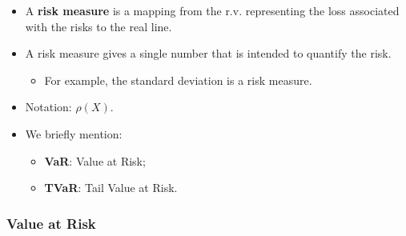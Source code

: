 \documentclass[]{book}
\providecommand{\tightlist}{%
  \setlength{\itemsep}{0pt}\setlength{\parskip}{0pt}}
\begin{document}
\begin{itemize}
\item
  A \textbf{risk measure} is a mapping from the r.v. representing the
  loss associated with the risks to the real line.
\item
  A risk measure gives a single number that is intended to quantify the
  risk.

  \begin{itemize}
  \tightlist
  \item
    For example, the standard deviation is a risk measure.
  \end{itemize}
\item
  Notation: \(\rho(X)\).
\item
  We briefly mention:

  \begin{itemize}
  \item
    \textbf{VaR}: Value at Risk;
  \item
    \textbf{TVaR}: Tail Value at Risk.
  \end{itemize}
\end{itemize}

\subsubsection{Value at Risk}\label{value-at-risk}
\end{document}
